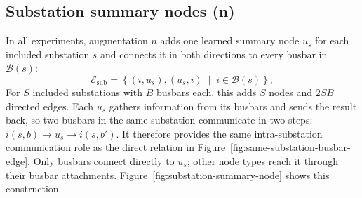 \subsection{Substation summary nodes (n)}
\label{sec:substation-summary-nodes}

In all experiments, augmentation $n$ adds one learned summary node $u_s$ for
each included substation $s$ and connects it in both directions to every busbar
in $\mathcal{B}(s)$:
\begin{equation}
  \mathcal{E}_{\mathrm{sub}} =
  \left\{
    (i,u_s),(u_s,i)
    \;\middle|\;
    i\in\mathcal{B}(s)
  \right\};
  \label{eq:substation-node-edges}
\end{equation}
For $S$ included substations with $B$ busbars each, this adds $S$ nodes and
$2SB$ directed edges. Each $u_s$ gathers information from its busbars and sends
the result back, so two busbars in the same substation communicate in two steps:
$i(s,b)\rightarrow u_s\rightarrow i(s,b')$. It therefore provides the same
intra-substation communication role as the direct relation in
Figure~\ref{fig:same-substation-busbar-edge}. Only busbars connect directly to
$u_s$; other node types reach it through their busbar attachments.
Figure~\ref{fig:substation-summary-node} shows this construction.

